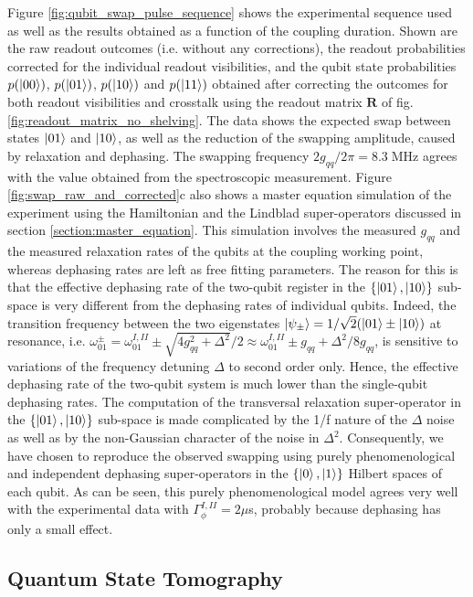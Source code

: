 Figure \ref{fig:qubit_swap_pulse_sequence} shows the experimental sequence used as well as the results obtained as a function of the coupling duration. Shown are the raw readout outcomes (i.e. without any corrections), the readout probabilities corrected for the individual readout visibilities, and  the qubit state probabilities $p(\left| 00 \right>)$, $p(\left| 01 \right>)$, $p(\left| 10 \right>)$ and $p(\left| 11 \right>)$ obtained after correcting the outcomes for both readout visibilities and crosstalk using the readout matrix $\mathbf{R}$ of fig. \ref{fig:readout_matrix_no_shelving}. The data shows the expected swap between states $\left| 01 \right>$ and $\left| 10 \right>$, as well as the reduction of the swapping amplitude, caused by relaxation and dephasing. The swapping frequency $2g_{qq}/2\pi = 8.3\;\mathrm{MHz}$ agrees with the value obtained from the spectroscopic measurement. Figure \ref{fig:swap_raw_and_corrected}c also shows a master equation simulation of the experiment using the Hamiltonian and the Lindblad super-operators discussed in section \ref{section:master_equation}. This simulation involves the measured $g_{qq}$ and the measured relaxation rates of the qubits  at the coupling working point, whereas dephasing rates are left as free fitting parameters. The reason for this is that the effective dephasing rate of the two-qubit register in the $\{\left| 01 \right>,\left| 10 \right>\}$ sub-space is very different from the dephasing rates of individual qubits. Indeed, the transition frequency between the two eigenstates $\left| \psi_\pm \right>=1/\sqrt{2}(\left| 01 \right>\pm\left| 10 \right>)$ at resonance, i.e. $\omega_{01}^{\pm}=\omega_{01}^{I,II}\pm\sqrt{4g_{qq}^2+\Delta^2}/2\approx \omega_{01}^{I,II}\pm g_{qq} +\Delta^2/8g_{qq}$, is sensitive to variations of the frequency detuning $\Delta$ to second order only. Hence, the effective dephasing rate of the two-qubit system is much lower than the single-qubit dephasing rates. The computation of the transversal relaxation super-operator in the $\{\left| 01 \right>,\left| 10 \right>\}$ sub-space is made complicated by the 1/f nature of the $\Delta$ noise as well as by the non-Gaussian character of the noise in $\Delta^2$.  Consequently, we have chosen to reproduce the observed swapping using purely phenomenological and independent dephasing super-operators in the $\{\left| 0 \right>,\left| 1 \right>\}$ Hilbert spaces of each qubit. As can be seen, this purely phenomenological model agrees very well with the experimental data with $\Gamma_{\phi}^{I,II}=2\mu$s, probably because dephasing has only a small effect.


\subsection{Quantum State Tomography}

